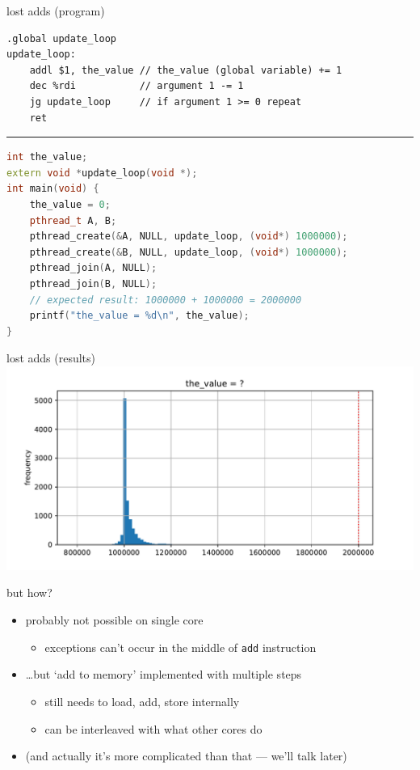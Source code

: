 
\begin{frame}[fragile,label=lostAdds]{lost adds (program)}
\begin{lstlisting}[language=myasm,style=smaller]
.global update_loop
update_loop:
    addl $1, the_value // the_value (global variable) += 1
    dec %rdi           // argument 1 -= 1
    jg update_loop     // if argument 1 >= 0 repeat
    ret
\end{lstlisting}
\hrule
\begin{lstlisting}[language=C++,style=smaller]
int the_value;
extern void *update_loop(void *);
int main(void) {
    the_value = 0;
    pthread_t A, B;
    pthread_create(&A, NULL, update_loop, (void*) 1000000);
    pthread_create(&B, NULL, update_loop, (void*) 1000000);
    pthread_join(A, NULL);
    pthread_join(B, NULL);
    // expected result: 1000000 + 1000000 = 2000000
    printf("the_value = %d\n", the_value);
}
\end{lstlisting}
\end{frame}

\begin{frame}[fragile,label=lostAddsResult]{lost adds (results)}
\includegraphics[width=1.1\textwidth]{../sync/parallel-add-histogram}
\end{frame}

\begin{frame}{but how?}
    \begin{itemize}
    \item probably not possible on single core
        \begin{itemize}
            \item exceptions can't occur in the middle of \texttt{add} instruction
        \end{itemize}
    \item \ldots but `add to memory' implemented with multiple steps
        \begin{itemize}
        \item still needs to load, add, store internally
        \item can be interleaved with what other cores do
        \end{itemize}
        \vspace{.5cm}
    \item<2-> {\small (and actually it's more complicated than that --- we'll talk later)}
    \end{itemize}
\end{frame}

